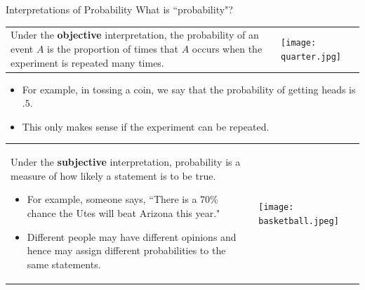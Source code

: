 \documentclass[xcolor=table]{beamer}
\renewcommand{\emph}{\textbf}
\begin{document}
%


\begin{frame}{Interpretations of Probability}
What is ``probability"?
\pause\begin{tabular}{@{}p{8.5cm}p{1.5cm}}
\vspace{0cm}
Under the \emph{objective} interpretation, the probability of an event $A$ is the proportion of times that $A$ occurs when the experiment is repeated many times.
&
\vspace{0cm}
\texttt{[image: quarter.jpg]}
\end{tabular}

\pause \begin{itemize}
\item For example, in tossing a coin, we say that the probability of getting heads is $.5$.
\item This only makes sense if the experiment can be repeated.
\end{itemize}
\pause 
\begin{tabular}{@{}p{8.5cm}p{1.5cm}}
\vspace{0cm}
Under the \emph{subjective} interpretation, probability is a 
measure of how likely a statement is to be true. 

\begin{itemize}
\item For example, someone says, ``There is a 70\% chance the Utes will beat Arizona this year."
\pause \item Different people may have different opinions and hence may assign different probabilities to the same statements.
\end{itemize}
&\vspace{0cm}
\texttt{[image: basketball.jpeg]}
\end{tabular}
\end{frame}
\end{document}

